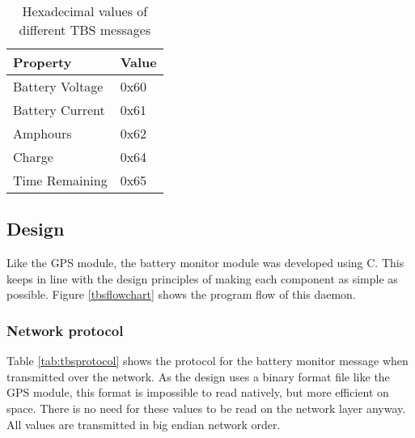 \begin{table}
\begin{center}
    \begin{tabular}{|l|l|}
        \hline
	\label{tab:tbsmessages}
        Property & Value \\ \hline
        Battery Voltage   & 0x60 \\
        Battery Current    & 0x61    \\ 
        Amphours    & 0x62    \\ 
        Charge       &  0x64 \\ 
        Time Remaining & 0x65 \\
        \hline
    \end{tabular}
	\caption{Hexadecimal values of different TBS messages}
	\label{tab:tbsmessages}
\end{center}
\end{table}




\subsection {Design}

Like the GPS module, the battery monitor module was developed using C. This keeps in line with the design principles of making each component as simple as possible. Figure \ref{tbsflowchart} shows the program flow of this daemon.


\subsubsection{Network protocol}

Table \ref{tab:tbsprotocol} shows the protocol for the battery monitor message when transmitted over the network. As the design uses a binary format file like the GPS module, this format is impossible to read natively, but more efficient on space. There is no need for these values to be read on the network layer anyway. All values are transmitted in big endian network order.

